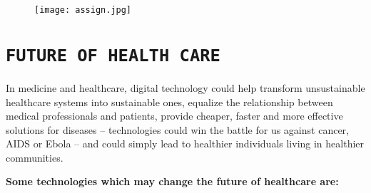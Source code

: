 \documentclass[12pt]{article}
\begin{document}
\vspace{0.5cm}

\begin{figure}[h]
\centering
\texttt{[image: assign.jpg]}
\end{figure}

\pagebreak


\section{\Large\centering\texttt{FUTURE OF HEALTH CARE}}

In medicine and healthcare, digital technology could help transform unsustainable healthcare systems into sustainable ones, equalize the relationship between medical professionals and patients, provide cheaper, faster and more effective solutions for diseases – technologies could win the battle for us against cancer, AIDS or Ebola – and could simply lead to healthier individuals living in healthier communities.\\


\vspace{0.5cm}

\textbf{Some technologies which may change the future of healthcare are:}
\end{document}

